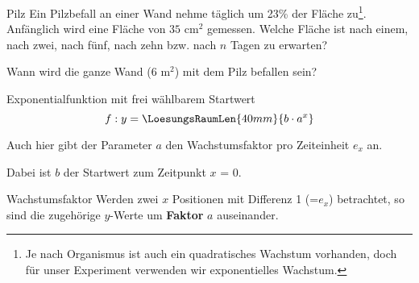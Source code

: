 \begin{beispiel}{Pilz}{}
  Ein Pilzbefall an einer Wand nehme täglich um 23\% der Fläche
  zu\footnote{Je nach Organismus ist auch ein quadratisches Wachstum
  vorhanden, doch für unser Experiment verwenden wir exponentielles Wachstum.}.
  Anfänglich wird eine Fläche von $35$ $\text{cm}^2$ gemessen.
  Welche Fläche ist nach einem, nach zwei, nach fünf, nach zehn
  bzw. nach $n$ 
  Tagen zu erwarten?


  Wann wird die ganze Wand ($6 \text{ m}^2$) mit dem Pilz befallen
  sein?
  

\end{beispiel}

\newpage


\begin{gesetz}{Exponentialfunktion mit frei wählbarem Startwert}{}
$$f: y = \LoesungsRaumLen{40mm}{b\cdot{}a^x}$$

Auch hier gibt der Parameter $a$ den Wachstumsfaktor pro Zeiteinheit $e_x$ an.

Dabei ist $b$ der Startwert zum Zeitpunkt $x$ = 0.
\end{gesetz}



\begin{bemerkung}{Wachstumsfaktor}{}{}
Werden zwei $x$ Positionen mit Differenz 1 (=$e_x$) betrachtet, so sind
die zugehörige $y$-Werte um \textbf{Faktor} $a$ auseinander.
\end{bemerkung}

